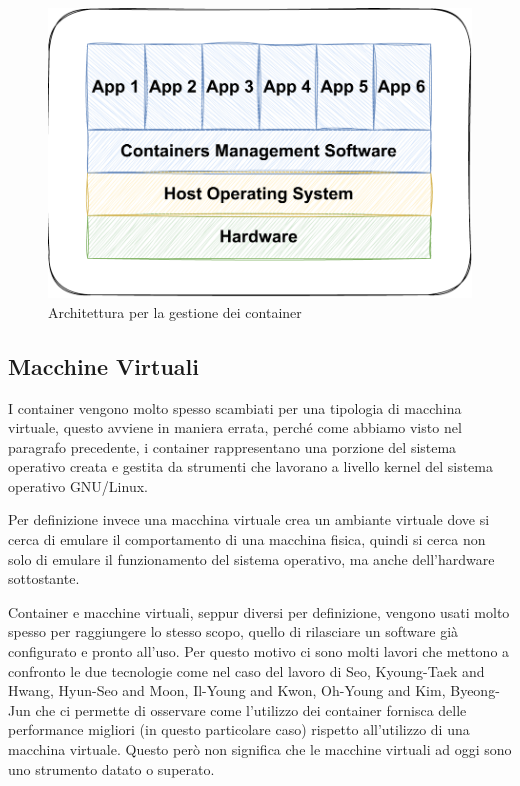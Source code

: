 \begin{figure}[h]
    \centering
    \includegraphics[scale=0.65]{capitoli/immagini/05_container_architecture.pdf}
    \caption{Architettura per la gestione dei container}
    \label{fig:container_architecture}
\end{figure}

\subsection{Macchine Virtuali}
I container vengono molto spesso scambiati per una tipologia di macchina virtuale, questo avviene in maniera errata, perché come abbiamo visto nel paragrafo precedente, i container rappresentano una porzione del sistema operativo creata e gestita da strumenti che lavorano a livello kernel del sistema operativo GNU/Linux. 

Per definizione invece una macchina virtuale crea un ambiante virtuale dove si cerca di emulare il comportamento di una macchina fisica, quindi si cerca non solo di emulare il funzionamento del sistema operativo, ma anche dell'hardware sottostante.

Container e macchine virtuali, seppur diversi per definizione, vengono usati molto spesso per raggiungere lo stesso scopo, quello di rilasciare un software già configurato e pronto all'uso. Per questo motivo ci sono molti lavori che mettono a confronto le due tecnologie come nel caso del lavoro \cite{seo2014performance} di Seo, Kyoung-Taek and Hwang, Hyun-Seo and Moon, Il-Young and Kwon, Oh-Young and Kim, Byeong-Jun che ci permette di osservare come l'utilizzo dei container fornisca delle performance migliori (in questo particolare caso) rispetto all'utilizzo di una macchina virtuale. Questo però non significa che le macchine virtuali ad oggi sono uno strumento datato o superato.

